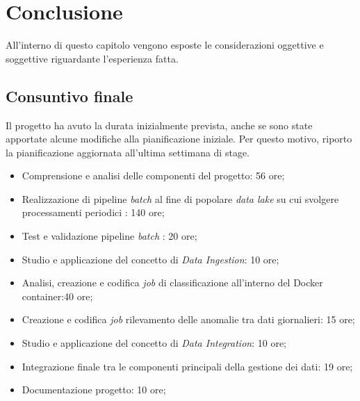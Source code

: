 \chapter{Conclusione}
\label{ch:conlusione}
All'interno di questo capitolo vengono esposte le considerazioni oggettive e soggettive riguardante l'esperienza fatta. 
\section{Consuntivo finale}
Il progetto ha avuto la durata inizialmente prevista, anche se sono state apportate alcune modifiche alla pianificazione iniziale. Per questo motivo, riporto la pianificazione aggiornata all'ultima settimana di stage.
\begin{itemize}
	\item Comprensione e analisi delle componenti del progetto: 56 ore;
	\item Realizzazione di pipeline \emph{batch} al fine di popolare \emph{\gls{data lake}} su cui svolgere processamenti periodici : 140 ore;
	\item Test e validazione pipeline \emph{batch} : 20 ore;
	\item Studio e applicazione del concetto di \emph{Data Ingestion}: 10  ore;
	\item Analisi, creazione e codifica \emph{job} di classificazione all'interno del Docker container:40 ore;
	\item Creazione e codifica \emph{job} rilevamento delle anomalie tra dati giornalieri: 15 ore;
	\item Studio e applicazione del concetto di \emph{Data Integration}: 10  ore;
	\item Integrazione finale tra le componenti principali della gestione dei dati: 19 ore;
	\item Documentazione progetto: 10 ore;
\end{itemize}
